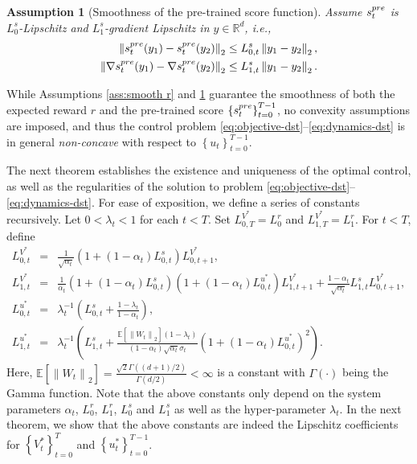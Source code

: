 \documentclass[10pt,a4paper]{amsart}
\newtheorem{Assumption}[Theorem]{Assumption}
\newcommand{\R}{\mathbb{R}}
\newcommand{\curly}[1]{\left\lbrace #1 \right\rbrace}
\newcommand{\bracket}[1]{\left[ #1 \right]}
\newcommand{\parenthesis}[1]{\left( #1 \right)}
\newcommand{\norm}[1]{\left \|#1\right \|}
\newcommand{\E}{\mathbb{E}}
\begin{document}
\begin{Assumption}[Smoothness of the pre-trained score function]\label{ass:smooth s}
    Assume $s_t^{\rm pre}$ is $L_{0}^{s}$-Lipschitz and $L_{1}^{s}$-gradient Lipschitz in $y \in \R^d$, i.e.,
    \begin{align}
        \norm{s_t^{\rm pre}(y_1) - s_t^{\rm pre}(y_2) }_2 \leq L_{0,t}^{s}\norm{y_1 - y_2}_2, \\ 
        \norm{\nabla s_t^{\rm pre}(y_1) - \nabla s_t^{\rm pre}(y_2) }_2 \leq L_{1,t}^{s}\norm{y_1 - y_2}_2.
    \end{align}
\end{Assumption}

While Assumptions \ref{ass:smooth r} and \ref{ass:smooth s} guarantee the smoothness of both the expected reward $r$ and the pre-trained score $\curly{s_t^{\rm pre}}_{t=0}^{T-1}$, no convexity assumptions are imposed, and thus the control problem \eqref{eq:objective-dst}--\eqref{eq:dynamics-dst} is in general {\it non-concave} with respect to $\curly{u_t}_{t=0}^{T-1}$.

The next theorem establishes the existence and uniqueness of the optimal control, as well as the regularities of the solution to problem \eqref{eq:objective-dst}--\eqref{eq:dynamics-dst}. For ease of exposition, we define  a series of constants recursively. Let $0 < \lambda_t < 1$ for each $ t < T$. Set $L_{0, T}^{V^{*}} = L_0^r$ and $L_{1, T}^{V^{*}} = L_1^r$. For $ t < T$, define
\begin{eqnarray}
    L_{0,t}^{V^{*}} &=& \frac{1}{\sqrt{\alpha_t}}(1 + (1 - \alpha_t)L_{0, t}^s)L_{0, t+1}^{V^{*}}, \label{eq:LV0star}\\ 
    L_{1, t}^{V^{*}} &=& \frac{1}{\alpha_{t}}(1 + (1 - \alpha_{t})L_{0, t}^s)(1 + (1 - \alpha_{t})L_{0, t}^{u^{*}})L_{1,t+1}^{V^{*}} + \frac{1 - \alpha_{t}}{\sqrt{\alpha_{t}}}L_{1, t}^s L_{0,t+1}^{V^{*}},\label{eq:LV1star} \\ 
    L_{0, t}^{u^*} & =& \lambda_{t}^{-1}\parenthesis{L_{0, t}^s + \frac{1 - \lambda_t}{1- \alpha_t}}, \label{eq:Lu0star}\\ 
    L_{1, t}^{u^*}  &= & \lambda_{t}^{-1}\parenthesis{L_{1, t}^{s} +  \frac{\E\bracket{\norm{W_{t}}_2}(1 - \lambda_t)}{(1 - \alpha_t)\sqrt{\alpha_{t}}\sigma_{t}}\parenthesis{1 + (1 - \alpha_{t})L_{0,t}^{u^{*}}}^{2}}.\label{eq:Lu1star}
\end{eqnarray}
Here, $\E\bracket{\norm{W_t}_2} = \frac{\sqrt{2}\Gamma((d+1)/2)}{\Gamma(d/2)} < \infty $ is a constant with $\Gamma(\cdot)$ being the Gamma function. Note that the above constants only depend on the system parameters $\alpha_t$, $L_0^r$, $L_1^r$, $L_0^s$ and $L_1^s$ as well as the hyper-parameter $\lambda_t$. In the next theorem, we show that the above constants are indeed the Lipschitz coefficients for $\curly{V_t^{*}}_{t = 0}^{T}$ and $\curly{u_t^{*}}_{t=0}^{T-1}$.
%
\end{document}
